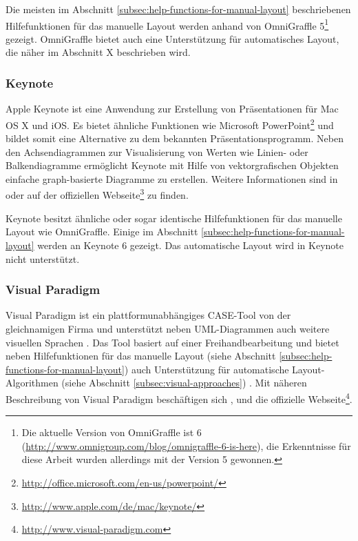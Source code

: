 Die meisten im Abschnitt \ref{subsec:help-functions-for-manual-layout} beschriebenen Hilfefunktionen für das manuelle Layout werden anhand von OmniGraffle 5\footnote{Die aktuelle Version von OmniGraffle ist 6 (\url{http://www.omnigroup.com/blog/omnigraffle-6-is-here}), die Erkenntnisse für diese Arbeit wurden allerdings mit der Version 5 gewonnen.} gezeigt. OmniGraffle bietet auch eine Unterstützung für automatisches Layout, die näher im Abschnitt X beschrieben wird.

\subsubsection{Keynote}
\label{subsubsec:keynote}

Apple Keynote ist eine Anwendung zur Erstellung von Präsentationen für Mac OS X und iOS. Es bietet ähnliche Funktionen wie Microsoft PowerPoint\footnote{\url{http://office.microsoft.com/en-us/powerpoint/}} und bildet somit eine Alternative zu dem bekannten Präsentationsprogramm. Neben den Achsendiagrammen zur Visualisierung von Werten wie Linien- oder Balkendiagramme ermöglicht Keynote mit Hilfe von vektorgrafischen Objekten einfache graph-basierte Diagramme zu erstellen. Weitere Informationen sind in \cite{11Keynote} oder auf der offiziellen Webseite\footnote{\url{http://www.apple.com/de/mac/keynote/}} zu finden. 

Keynote besitzt ähnliche oder sogar identische Hilfefunktionen für das manuelle Layout wie OmniGraffle. Einige im Abschnitt \ref{subsec:help-functions-for-manual-layout} werden an Keynote 6 gezeigt. Das automatische Layout wird in Keynote nicht unterstützt.

\subsubsection{Visual Paradigm}
\label{subsubsec:visual-paradigm}

Visual Paradigm ist ein plattformunabhängiges CASE-Tool von der gleichnamigen Firma und unterstützt neben UML-Diagrammen auch weitere visuellen Sprachen \cite{14Visual}. Das Tool basiert auf einer Freihandbearbeitung und bietet neben Hilfefunktionen für das manuelle Layout (siehe Abschnitt \ref{subsec:help-functions-for-manual-layout}) auch Unterstützung für automatische Layout-Algorithmen (siehe Abschnitt \ref{subsec:visual-approaches}) \cite{Fuhrmann11On-the-Pragmatics}. Mit näheren Beschreibung von Visual Paradigm beschäftigen sich \cite{14Visual}, \cite[S.313-314]{Fuhrmann11On-the-Pragmatics} und die offizielle Webseite\footnote{\url{http://www.visual-paradigm.com}}.

